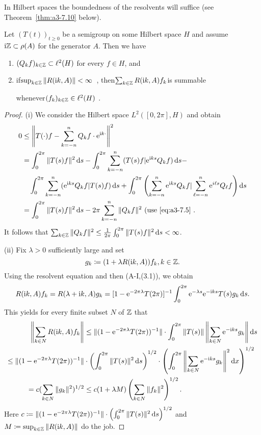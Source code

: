 In Hilbert spaces the boundedness of the resolvents will suffice (see Theorem~\ref{thm:a3-7.10} below).
\begin{lemma}\label{lem:a3-7.9}
Let $(T(t))_{t\geq 0}$ be a semigroup on some Hilbert space $H$ and assume $\mathrm{i}\mathbb{Z} \subset \rho(A)$ for the generator $A$.
Then we have
\begin{enumerate}[\upshape (i)]
\item 
$(Q_{k}f)_{k\in\mathbb{Z}} \subset \ell^{2}(H)$ for every $f \in H$, and

\item 
if\quad $\sup_{k\in\mathbb{Z}}\|R(\mathrm{i} k,A)\| < \infty$~, then\quad $\sum_{k\in\mathbb{Z}} R(\mathrm{i} k,A)f_{k}$\quad is summable 

whenever\quad $(f_{k})_{k\in\mathbb{Z}} \in \ell^{2}(H)$ .
\end{enumerate}
\end{lemma}
\begin{proof}
(i) We consider the Hilbert space $L^{2}([0,2\pi],H)$ and obtain
\begin{align*}
0 &\leq \left\|T(\cdot)f - \sum_{k=-n}^{n} Q_{k}f\cdot \mathrm{e}^{\mathrm{i} k\cdot}\right\|^{2} \\
&= \int_{0}^{2\pi} \|T(s)f\|^{2} \mathop{}\!\mathrm{d}{s} - \int_{0}^{2\pi} \sum_{k=-n}^{n} (T(s)f|\mathrm{e}^{\mathrm{i} ks}Q_{k}f) \mathop{}\!\mathrm{d}{s} - \\
&\quad \int_{0}^{2\pi} \sum_{k=-n}^{n} (\mathrm{e}^{\mathrm{i} ks}Q_{k}f|T(s)f) \mathop{}\!\mathrm{d}{s} + \int_{0}^{2\pi} \left(\sum_{k=-n}^{n} \mathrm{e}^{\mathrm{i} ks}Q_{k}f|\sum_{\ell=-n}^{n} \mathrm{e}^{i\ell s}Q_{\ell}f\right) \mathop{}\!\mathrm{d}{s} \\
&= \int_{0}^{2\pi} \|T(s)f\|^{2} \mathop{}\!\mathrm{d}{s} - 2\pi\sum_{k=-n}^{n} \|Q_{k}f\|^{2} \text{ (use \eqref{eq:a3-7.5} } .
\end{align*}
It follows that $\sum_{k\in\mathbb{Z}} \|Q_{k}f\|^{2} \leq \frac{1}{2\pi}\int_{0}^{2\pi} \|T(s)f\|^{2} \mathop{}\!\mathrm{d}{s} < \infty$.

(ii) Fix $\lambda > 0$ sufficiently large and set 
\[
g_{k}\coloneqq (1 + \lambda R(\mathrm{i} k,A))f_{k}, k \in \mathbb{Z} .
\]
Using the resolvent equation and then (A-I,(3.1)), we obtain
\[
R(\mathrm{i} k,A)f_{k} = R(\lambda + \mathrm{i} k,A)g_{k} = [1 - \mathrm{e}^{-2\pi\lambda}T(2\pi)]^{-1}\int_{0}^{2\pi} \mathrm{e}^{-\lambda s}\mathrm{e}^{-\mathrm{i} ks}T(s)g_{k} \mathop{}\!\mathrm{d}{s} .
\]
This yields for every finite subset $N$ of $\mathbb{Z}$ that
\begin{align*}
	\left\|\sum_{k\in N} R(\mathrm{i} k,A)f_{k}\right\| & 
		\leq \|(1 - \mathrm{e}^{-2\pi\lambda}T(2\pi))^{-1}\|\cdot\int_{0}^{2\pi} \|T(s)\| 
			\left\|\sum_{k\in N} \mathrm{e}^{-\mathrm{i} ks}g_{k}\right\| \mathop{}\!\mathrm{d}{s}
\\
	\leq \|(1 - \mathrm{e}^{-2\pi\lambda}T(2\pi))^{-1}\| & \cdot 
	\left(\int_{0}^{2\pi}\|T(s)\|^{2} \mathop{}\!\mathrm{d}{s}\right)^{1/2} \cdot \left(\int_{0}^{2\pi}\left\|\sum_{k\in N} 
	\mathrm{e}^{-\mathrm{i} ks}g_{k}\right\|^{2} \mathop{}\!\mathrm{d}{x} \right)^{1/2}
\\
	= c(\sum_{k\in N} \|g_{k}\|^{2})^{1/2} & \leq c(1 + \lambda M)\left(\sum_{k\in N} \|f_{k}\|^{2}\right)^{1/2} .
\end{align*}
Here $c\coloneqq \|(1 - \mathrm{e}^{-2\pi\lambda}T(2\pi))^{-1}\|\cdot\left(\int_{0}^{2\pi}\|T(s)\|^{2} \mathop{}\!\mathrm{d}{s}\right)^{1/2}$ and $M\coloneqq \sup_{k\in\mathbb{Z}}\|R(\mathrm{i} k,A)\|$ do the job.
\end{proof}
